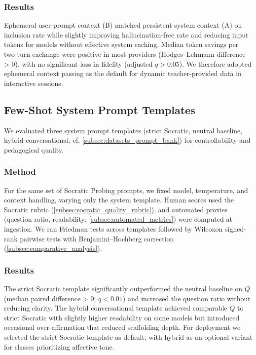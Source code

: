 \subsubsection{Results}\label{subsubsec:contextualization_results}

Ephemeral user-prompt context (B) matched persistent system context (A) on inclusion rate while slightly improving hallucination-free rate and reducing input tokens for models without effective system caching. Median token savings per two-turn exchange were positive in most providers (Hodges--Lehmann difference \textgreater{} 0), with no significant loss in fidelity (adjusted $q>0.05$). We therefore adopted ephemeral context passing as the default for dynamic teacher-provided data in interactive sessions.

\subsection{Few-Shot System Prompt Templates}\label{subsec:few_shot_prompts}

We evaluated three system prompt templates (strict Socratic, neutral baseline, hybrid conversational; cf. \cref{subsec:datasets_prompt_bank}) for controllability and pedagogical quality.

\subsubsection{Method}\label{subsubsec:few_shot_method}

For the same set of Socratic Probing prompts, we fixed model, temperature, and context handling, varying only the system template. Human scores used the Socratic rubric (\cref{subsec:socratic_quality_rubric}), and automated proxies (question ratio, readability; \cref{subsec:automated_metrics}) were computed at ingestion. We ran Friedman tests across templates followed by Wilcoxon signed-rank pairwise tests with Benjamini--Hochberg correction (\cref{subsec:comparative_analysis}).

\subsubsection{Results}\label{subsubsec:few_shot_results}

The strict Socratic template significantly outperformed the neutral baseline on $Q$ (median paired difference \textgreater{} 0; $q<0.01$) and increased the question ratio without reducing clarity. The hybrid conversational template achieved comparable $Q$ to strict Socratic with slightly higher readability on some models but introduced occasional over-affirmation that reduced scaffolding depth. For deployment we selected the strict Socratic template as default, with hybrid as an optional variant for classes prioritizing affective tone.

